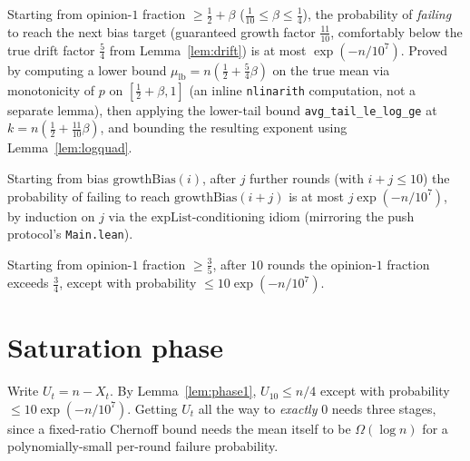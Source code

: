 \begin{lemma}\label{lem:growthround}
  \leanok
  Starting from opinion-$1$ fraction $\ge\tfrac12+\beta$
  ($\tfrac1{10}\le\beta\le\tfrac14$), the probability of \emph{failing} to
  reach the next bias target (guaranteed growth factor $\tfrac{11}{10}$,
  comfortably below the true drift factor $\tfrac54$ from
  Lemma~\ref{lem:drift}) is at most $\exp(-n/10^7)$. Proved by computing a
  lower bound $\mu_{\mathrm{lb}} = n(\tfrac12+\tfrac54\beta)$ on the true
  mean via monotonicity of $p$ on $[\tfrac12+\beta,1]$ (an inline
  \texttt{nlinarith} computation, not a separate lemma), then applying the
  lower-tail bound \texttt{avg\_tail\_le\_log\_ge} at
  $k=n(\tfrac12+\tfrac{11}{10}\beta)$, and bounding the resulting exponent
  using Lemma~\ref{lem:logquad}.
\end{lemma}

\begin{lemma}\label{lem:growthfail}
  \leanok
  Starting from bias $\mathrm{growthBias}(i)$, after $j$ further rounds
  (with $i+j\le10$) the probability of failing to reach
  $\mathrm{growthBias}(i+j)$ is at most $j\exp(-n/10^7)$, by induction on
  $j$ via the $\mathrm{expList}$-conditioning idiom (mirroring the push
  protocol's \texttt{Main.lean}).
\end{lemma}

\begin{lemma}[Phase 1]\label{lem:phase1}
  \leanok
  Starting from opinion-$1$ fraction $\ge\tfrac35$, after $10$ rounds the
  opinion-$1$ fraction exceeds $\tfrac34$, except with probability
  $\le10\exp(-n/10^7)$.
\end{lemma}

\section{Saturation phase}\label{sec:saturation}

Write $U_t = n-X_t$. By Lemma~\ref{lem:phase1}, $U_{10}\le n/4$ except with
probability $\le10\exp(-n/10^7)$. Getting $U_t$ all the way to
\emph{exactly} $0$ needs three stages, since a fixed-ratio Chernoff bound
needs the mean itself to be $\Omega(\log n)$ for a polynomially-small
per-round failure probability.

